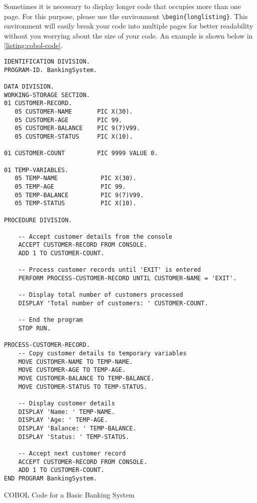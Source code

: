 Sometimes it is necessary to display longer code that occupies more than one page. For this purpose, please use the environment \verb|\begin{longlisting}|. This environment will easily break your code into multiple pages for better readability without you worrying about the size of your code. An example is shown below in \autoref{listing:cobol-code}.

\begin{longlisting}
\begin{verbatim}
IDENTIFICATION DIVISION.
PROGRAM-ID. BankingSystem.

DATA DIVISION.
WORKING-STORAGE SECTION.
01 CUSTOMER-RECORD.
   05 CUSTOMER-NAME       PIC X(30).
   05 CUSTOMER-AGE        PIC 99.
   05 CUSTOMER-BALANCE    PIC 9(7)V99.
   05 CUSTOMER-STATUS     PIC X(10).

01 CUSTOMER-COUNT         PIC 9999 VALUE 0.

01 TEMP-VARIABLES.
   05 TEMP-NAME            PIC X(30).
   05 TEMP-AGE             PIC 99.
   05 TEMP-BALANCE         PIC 9(7)V99.
   05 TEMP-STATUS          PIC X(10).

PROCEDURE DIVISION.

    -- Accept customer details from the console
    ACCEPT CUSTOMER-RECORD FROM CONSOLE.
    ADD 1 TO CUSTOMER-COUNT.

    -- Process customer records until 'EXIT' is entered
    PERFORM PROCESS-CUSTOMER-RECORD UNTIL CUSTOMER-NAME = 'EXIT'.

    -- Display total number of customers processed
    DISPLAY 'Total number of customers: ' CUSTOMER-COUNT.

    -- End the program
    STOP RUN.

PROCESS-CUSTOMER-RECORD.
    -- Copy customer details to temporary variables
    MOVE CUSTOMER-NAME TO TEMP-NAME.
    MOVE CUSTOMER-AGE TO TEMP-AGE.
    MOVE CUSTOMER-BALANCE TO TEMP-BALANCE.
    MOVE CUSTOMER-STATUS TO TEMP-STATUS.

    -- Display customer details
    DISPLAY 'Name: ' TEMP-NAME.
    DISPLAY 'Age: ' TEMP-AGE.
    DISPLAY 'Balance: ' TEMP-BALANCE.
    DISPLAY 'Status: ' TEMP-STATUS.

    -- Accept next customer record
    ACCEPT CUSTOMER-RECORD FROM CONSOLE.
    ADD 1 TO CUSTOMER-COUNT.
END PROGRAM BankingSystem.
\end{verbatim}
\caption{COBOL Code for a Basic Banking System}
\label{listing:cobol-code}
\end{longlisting}

